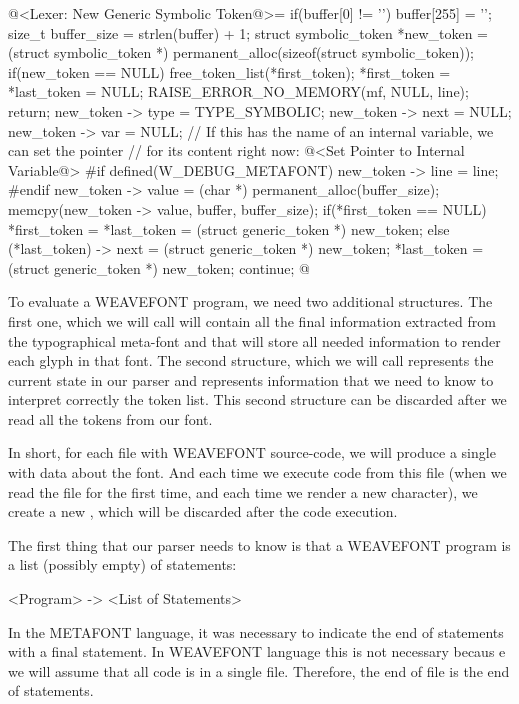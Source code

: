 \iniciocodigo
@<Lexer: New Generic Symbolic Token@>=
if(buffer[0] != '\0'){
  buffer[255] = '\0';
  size_t buffer_size = strlen(buffer) + 1;
  struct symbolic_token *new_token =
     (struct symbolic_token *) permanent_alloc(sizeof(struct symbolic_token));
  if(new_token == NULL){
    free_token_list(*first_token);
    *first_token = *last_token = NULL;
    RAISE_ERROR_NO_MEMORY(mf, NULL, line);
    return;
  }
  new_token -> type = TYPE_SYMBOLIC;
  new_token -> next = NULL;
  new_token -> var = NULL;
  // If this has the name of an internal variable, we can set the pointer
  // for its content right now:
  @<Set Pointer to Internal Variable@>
#if defined(W_DEBUG_METAFONT)
  new_token -> line = line;
#endif
  new_token -> value = (char *) permanent_alloc(buffer_size);
  memcpy(new_token -> value, buffer, buffer_size);
  if(*first_token == NULL)
    *first_token = *last_token = (struct generic_token *) new_token;
  else{
    (*last_token) -> next = (struct generic_token *) new_token;
    *last_token = (struct generic_token *) new_token;
  }
  continue;
}
@
\fimcodigo



To evaluate a WEAVEFONT program, we need two additional
structures. The first one, which we will call  will contain all the final information extracted from the
typographical meta-font and that will store all needed information to
render each glyph in that font. The second structure, which we will
call  represents the current state in our
parser and represents information that we need to know to interpret
correctly the token list. This second structure can be discarded after
we read all the tokens from our font.

In short, for each file with WEAVEFONT source-code, we will produce a
single  with data about the font. And each
time we execute code from this file (when we read the file for the
first time, and each time we render a new character), we create a
new , which will be discarded after the
code execution.

The first thing that our parser needs to know is that a WEAVEFONT
program is a list (possibly empty) of statements:

\alinhaverbatim
<Program> -> <List of Statements>
\alinhanormal

In the METAFONT language, it was necessary to indicate the end of
statements with a final  statement. In WEAVEFONT
language this is not necessary becaus e we will assume that all code
is in a single file. Therefore, the end of file is the end of
statements.

